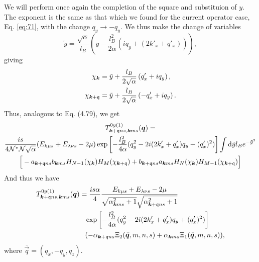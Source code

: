 We will perform once again the completion of the square and substituion of \(y\).
The exponent is the same as that which we found for the current operator case, Eq. \eqref{eq:71}, with the change \(q_{y} \to - q_{y}\).
We thus make the change of variables
\begin{equation}
  \label{eq:81}
  \tilde{y} = \frac{\sqrt{\alpha}}{l_{B}} \left(y  - \frac{l_{B}^2}{2 \alpha } (i q_{y} + (2k' _x + q' _x) )\right),
\end{equation}
giving
\begin{align}
  \chi _{\bm{k}} &= \tilde{y} + \frac{l_{B}}{2 \sqrt{\alpha }} \left( q'_x + i q_{y}\right),\\
  \chi _{\bm{k} + \mathfrak{q}} &= \tilde{y} + \frac{l_{B}}{2 \sqrt{\alpha }} \left( -q' _{x} + i q_{y}\right).
\end{align}
Thus, analogous to Eq. (4.79), we get
\begin{multline}
  \label{eq:82}
  T_{\bm{k} + \mathfrak{q} n s, \bm{k} m s}^{0y (1)} (\bm{q}) =\\
  \frac{is}{4 \mathcal{N}^{*}\mathcal{N} \sqrt{\alpha} }
  (E_{k\mu s} + E_{\lambda  \nu  s} - 2 \mu)
  \exp \left[
    -\frac{l_{B}^2}{4 \alpha } (q_{y}^2 - 2i (2 k' _x + q' _x) q_{y} + (q' _x)^2 )
  \right  ]
  \int \mathrm{d} \tilde{y} l_{B} e^{-\tilde{y}^2}\\
 \Big[
  - a_{\bm{k} + \mathfrak{q} ns} b_{\bm{k} m s}
  H_{N-1} ( \chi _{\bm{k}} )
  H_{M} ( \chi _{\bm{k} + \mathfrak{q}} )
  + b_{\bm{k} + \mathfrak{q} ns } a_{\bm{k} m s}
  H_{N}( \chi _{\bm{k}} )
  H_{M-1} ( \chi _{\bm{k} + \mathfrak{q}} )
  \Big]
\end{multline}
And thus we have
\begin{align}
  T_{\vec{k} + \qvec{q} n s, \vec{k} m s}^{0y (1)} (\vec{q}) &=
  \frac{is \alpha }{4  }
  \frac{E_{k\mu s} + E_{\lambda  \nu  s} - 2 \mu}{
    \sqrt{\alpha _{\vec{k} m s}^2 + 1}
    \sqrt{\alpha _{\vec{k} + \qvec{q} n s}^2 + 1}
  }\\
  &\pe \exp \left[
    -\frac{l_{B}^2}{4 \alpha } (q_{y}^2 - 2i ( 2k' _x + q' _x ) q_{y} + (q' _x)^2)
  \right  ]\\
  &\pe (-\alpha_{\vec{k}+\qvec{q} n s} \Xi_{2} (\bar{\vec{q}}, m, n, s) + \alpha_{\vec{k} m s} \Xi_{1}(\bar{\vec{q}}, m, n, s)),
\end{align}
where \(\bar{\vec{q}} = (q_{x}, -q_{y}, q_{z})\).

